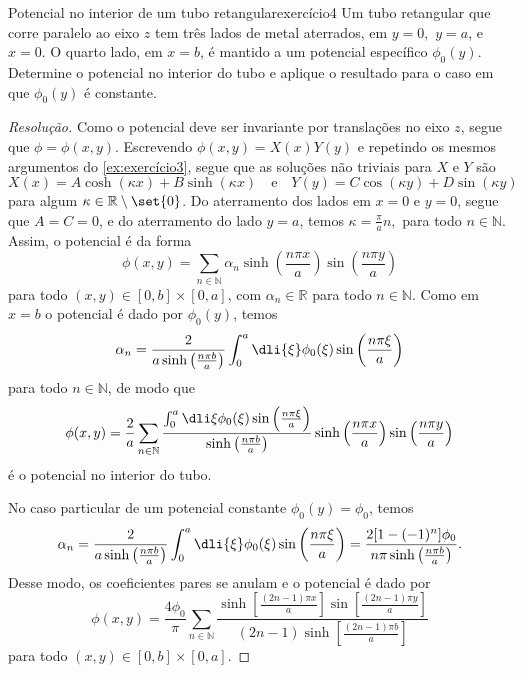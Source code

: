 \begin{exercício}{Potencial no interior de um tubo retangular}{exercício4}
    Um tubo retangular que corre paralelo ao eixo \(z\) tem três lados de metal aterrados, em \(y=0,\) \(y = a\), e \(x= 0.\) O quarto lado, em \(x = b\), é mantido a um potencial específico \(\phi_0(y)\). Determine o potencial no interior do tubo e aplique o resultado para o caso em que \(\phi_0(y)\) é constante.
\end{exercício}
\begin{proof}[Resolução]
    Como o potencial deve ser invariante por translações no eixo \(z\), segue que \(\phi = \phi(x,y)\). Escrevendo \(\phi(x,y) = X(x)Y(y)\) e repetindo os mesmos argumentos do \cref{ex:exercício3}, segue que as soluções não triviais para \(X\) e \(Y\) são
    \begin{equation*}
        X(x) = A \cosh(\kappa x) + B \sinh(\kappa x)\quad\text{e}\quad Y(y) = C \cos(\kappa y) + D \sin(\kappa y)
    \end{equation*}
    para algum \(\kappa \in \mathbb{R}\setminus\set{0}\). Do aterramento dos lados em \(x = 0\) e \(y = 0\), segue que \(A = C = 0\), e do aterramento do lado \(y = a\), temos \(\kappa = \frac{\pi}{a}n,\) para todo \(n \in \mathbb{N}\). Assim, o potencial é da forma
    \begin{equation*}
        \phi(x,y) = \sum_{n \in \mathbb{N}} \alpha_n \sinh\left(\frac{n \pi x}{a}\right) \sin\left(\frac{n \pi y}{a}\right)
    \end{equation*}
    para todo \((x,y) \in [0,b] \times [0,a]\), com \(\alpha_n \in \mathbb{R}\) para todo \(n \in \mathbb{N}\). Como em \(x = b\) o potencial é dado por \(\phi_0(y)\), temos
    \begin{equation*}
        \alpha_n = \frac{2}{a\sinh\left(\frac{n \pi b}{a}\right)} \int_0^a \dli{\xi} \phi_0(\xi)\sin\left(\frac{n \pi \xi}{a}\right)
    \end{equation*}
    para todo \(n \in \mathbb{N}\), de modo que
    \begin{equation*}
        \phi(x, y) = \frac{2}{a}\sum_{n \in \mathbb{N}} \frac{\int_0^a \dli\xi \phi_0(\xi) \sin \left(\frac{n \pi \xi}{a}\right)}{\sinh\left(\frac{n \pi b}{a}\right)}\sinh\left(\frac{n \pi x}{a}\right) \sin\left(\frac{n \pi y}{a}\right)
    \end{equation*}
    é o potencial no interior do tubo.

    No caso particular de um potencial constante \(\phi_0(y) = \phi_0\), temos
    \begin{equation*}
        \alpha_n = \frac{2}{a \sinh\left(\frac{n \pi b}{a}\right)}\int_0^a \dli{\xi} \phi_0(\xi)\sin\left(\frac{n \pi \xi}{a}\right) = \frac{2[1 - (-1)^{n}] \phi_0}{n \pi\sinh\left(\frac{n \pi b}{a}\right)}.
    \end{equation*}
    Desse modo, os coeficientes pares se anulam e o potencial é dado por
    \begin{equation*}
        \phi(x,y) = \frac{4\phi_0}{\pi} \sum_{n \in \mathbb{N}} \frac{\sinh\left[\frac{(2n - 1)\pi x}{a}\right]\sin\left[\frac{(2n - 1)\pi y}{a}\right]}{(2n - 1)\sinh\left[\frac{(2n -1)\pi b}{a}\right]}
    \end{equation*}
    para todo \((x,y) \in [0,b]\times[0,a]\).
\end{proof}
